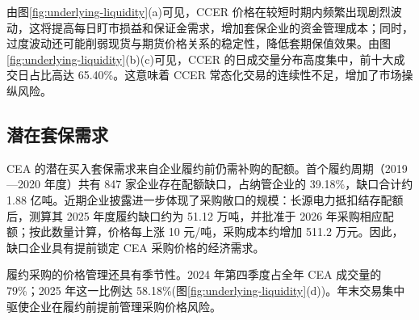 \documentclass[UTF8,a4paper,11pt,oneside,fontset=fandol]{ctexart}
\begin{document}
由图\ref{fig:underlying-liquidity}(a)可见，CCER 价格在较短时期内频繁出现剧烈波动，这将提高每日盯市损益和保证金需求，增加套保企业的资金管理成本；同时，过度波动还可能削弱现货与期货价格关系的稳定性，降低套期保值效果。由图\ref{fig:underlying-liquidity}(b)(c)可见，CCER 的日成交量分布高度集中，前十大成交日占比高达 65.40\%。这意味着 CCER 常态化交易的连续性不足，增加了市场操纵风险。

\subsection{潜在套保需求}
CEA 的潜在买入套保需求来自企业履约前仍需补购的配额。首个履约周期（2019—2020 年度）共有 847 家企业存在配额缺口，占纳管企业的 39.18\%，缺口合计约 1.88 亿吨\cite{mee2022compliance}。近期企业披露进一步体现了采购敞口的规模：长源电力抵扣结存配额后，测算其 2025 年度履约缺口约为 51.12 万吨，并批准于 2026 年采购相应配额\cite{changyuan2026purchase}；按此数量计算，价格每上涨 10 元/吨，采购成本约增加 511.2 万元。因此，缺口企业具有提前锁定 CEA 采购价格的经济需求。

履约采购的价格管理还具有季节性。2024 年第四季度占全年 CEA 成交量的 79\%\cite{mee2025development}；2025 年这一比例达 58.18\%\cite{she2025daily}(图\ref{fig:underlying-liquidity}(d))。年末交易集中驱使企业在履约前提前管理采购价格风险。
\end{document}
